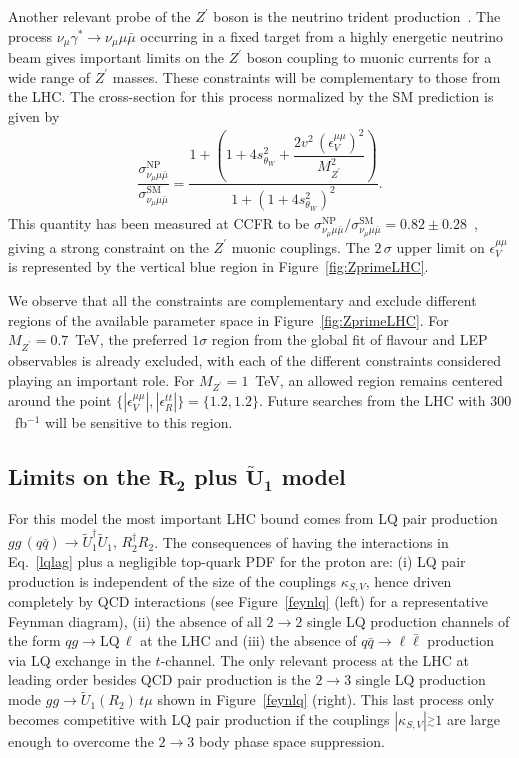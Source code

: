 \documentclass[aps,twocolumn,showpacs,preprintnumbers,amsmath,amssymb,floatfix,nofootinbib]{revtex4-1}
\newcommand{\gsim}{\stackrel{>}{_\sim}}
\begin{document}
Another relevant probe of the $Z^{\prime}$ boson is the neutrino trident production~\cite{Altmannshofer:2014pba}.    The process $\nu_\mu \gamma^*\to\nu_\mu\mu\bar\mu$ occurring in a fixed target from a highly energetic neutrino beam gives important limits on the $Z^\prime$ boson coupling to muonic currents for a wide range of $Z^\prime$ masses.  These constraints will be complementary to those from the LHC. The cross-section for this process normalized by the SM prediction is given by~\cite{Altmannshofer:2014pba}
%
\begin{align}
\dfrac{\sigma^{\text{NP}}_{\nu_\mu\mu\bar\mu}}{\sigma^{\text{SM}}_{\nu_\mu\mu\bar\mu}} = \dfrac{1+\left(1+4 s_{\theta_W}^2 +\dfrac{2v^2\,(\epsilon_V^{\mu\mu})^2}{M_{Z^\prime}^2}\right)}{1+(1+4 s_{\theta_W}^2)^2}.
\end{align}
%
This quantity has been measured at CCFR to be $\sigma^{\text{NP}}_{\nu_\mu\mu\bar\mu}/\sigma^{\text{SM}}_{\nu_\mu\mu\bar\mu}=0.82\pm0.28$~\cite{Mishra:1991bv}, giving a strong constraint on the $Z^\prime$ muonic couplings. The $2\,\sigma$ upper limit on $\epsilon_V^{\mu\mu}$ is represented by the vertical blue region in Figure~\ref{fig:ZprimeLHC}.   

We observe that all the constraints are complementary and exclude different regions of the available parameter space in Figure~\ref{fig:ZprimeLHC}.      For $M_{Z^{\prime}}=0.7$~TeV, the preferred $1\sigma$ region from the global fit of flavour and LEP observables is already excluded, with each of the different constraints considered playing an important role.   For $M_{Z^{\prime}} = 1$~TeV, an allowed region remains centered around the point $\{|\epsilon_{V}^{\mu \mu}|,|\epsilon_R^{tt}|\} = \{1.2, 1.2\}$.  Future searches from the LHC with $300$~fb$^{-1}$ will be sensitive to this region. 

\subsection{ Limits on the $\mathbf{R_2}$ plus $\mathbf{\widetilde{U}_1}$ model}\label{sec:R2U1highpt}

For this model the most important LHC bound comes from LQ pair production $gg\, (q\bar q)\to \widetilde{U}_1^\dagger \widetilde{U}_1,\,R_2^\dagger R_2$. The consequences of having the interactions in Eq.~\eqref{lqlag} plus a negligible top-quark PDF for the proton are: (i) LQ pair production is independent of the size of the couplings $\kappa_{S,V}$, hence driven completely by QCD interactions (see Figure~\ref{feynlq} (left) for a representative Feynman diagram), (ii) the absence of all $2\to2$ single LQ production channels of the form $qg\to\mathrm{LQ}\, \ell$ at the LHC and (iii) the absence of $q\bar q\to\ell\bar\ell$ production via LQ exchange in the $t$-channel. The only relevant process at the LHC at leading order besides QCD pair production is the $2\to3$ single LQ production mode $gg\to \widetilde{U}_1(R_2)\,t\mu$ shown in Figure~\ref{feynlq} (right). This last process only becomes competitive with LQ pair production if the couplings $|\kappa_{S,V} |\gsim1$ are large enough to overcome the $2\to3$ body phase space suppression.
\end{document}
